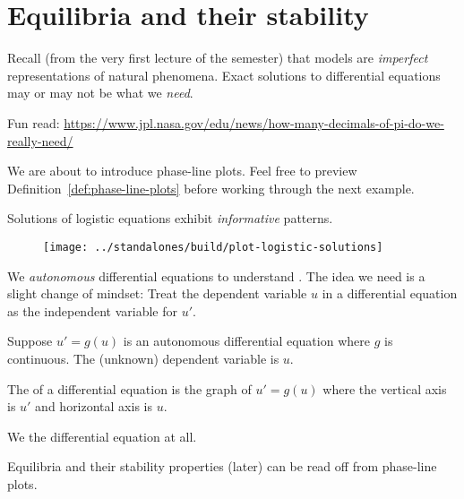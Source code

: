 \documentclass[../main.tex]{subfiles}
\begin{document}
 \section{Equilibria and their stability}

Recall (from the very first lecture of the semester) that models are \emph{imperfect} representations of natural phenomena. Exact solutions to differential equations may or may not be what we \emph{need}.  

{\footnotesize Fun read: \url{https://www.jpl.nasa.gov/edu/news/how-many-decimals-of-pi-do-we-really-need/}}

We are about to introduce phase-line plots. Feel free to preview Definition~\ref{def:phase-line-plots} before working through the next example.

\begin{example}
  Solutions of logistic equations exhibit \emph{informative} patterns.
  \begin{figure}[H] %
    \centering
    \texttt{[image: ../standalones/build/plot-logistic-solutions]}
    \label{fig:logistic-solutions}
  \end{figure}
  
\end{example}

\faStar{} We  \emph{autonomous} differential equations to understand .  The idea we need is a slight change of mindset: Treat the dependent variable \(u\) in a differential equation as the independent variable for \(u'\). 

\begin{definition} \label{def:phase-line-plots}
  Suppose \(u' = g(u)\) is an autonomous differential equation where \(g\) is continuous. The (unknown) dependent variable is \(u\).

  The  of a differential equation is the graph of \(u' = g(u)\) where the vertical axis is \(u'\) and horizontal axis is \(u\).  

  We  the differential equation at all.
\end{definition}

Equilibria and their stability properties (later) can be read off from phase-line plots. 
\end{document}

